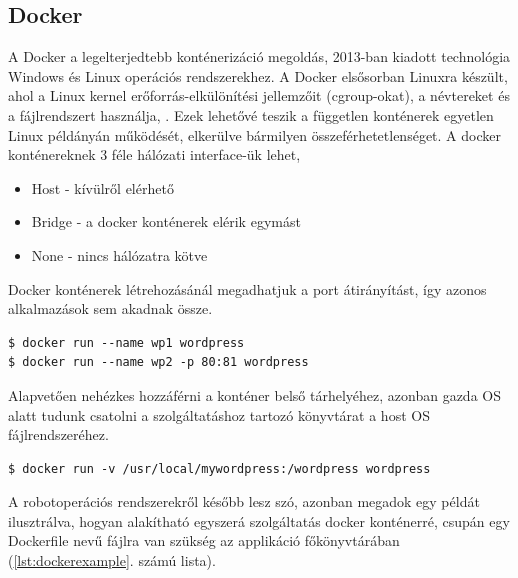 \subsection{Docker}
A Docker a legelterjedtebb konténerizáció megoldás, 2013-ban kiadott technológia Windows és Linux operációs rendszerekhez. A Docker elsősorban Linuxra készült, ahol a Linux kernel erőforrás-elkülönítési jellemzőit (cgroup-okat), a névtereket és a fájlrendszert használja, . Ezek lehetővé teszik a független konténerek egyetlen Linux példányán működését, elkerülve bármilyen összeférhetetlenséget.
A docker konténereknek 3 féle hálózati interface-ük lehet,
\begin{itemize}
	\item Host - kívülről elérhető
	\item Bridge - a docker konténerek elérik egymást
	\item None - nincs hálózatra kötve
\end{itemize}
Docker konténerek létrehozásánál megadhatjuk a port átirányítást, így azonos alkalmazások sem akadnak össze.
\begin{minipage}{\linewidth}
\begin{lstlisting}[caption={Példa két WordPress szolgáltatás párhuzamos indítására a 80 és 81-es portokon}]
$ docker run --name wp1 wordpress
$ docker run --name wp2 -p 80:81 wordpress
\end{lstlisting}
\end{minipage}
Alapvetően nehézkes hozzáférni a konténer belső tárhelyéhez, azonban gazda OS alatt tudunk csatolni a szolgáltatáshoz tartozó könyvtárat a host OS fájlrendszeréhez.
\begin{lstlisting}[caption={Példa volume csatolásához}]
$ docker run -v /usr/local/mywordpress:/wordpress wordpress
\end{lstlisting}
A robotoperációs rendszerekről később lesz szó, azonban megadok egy példát ilusztrálva, hogyan alakítható egyszerá szolgáltatás docker konténerré, csupán egy Dockerfile nevű fájlra van szükség az applikáció főkönyvtárában (\ref{lst:dockerexample}. számú lista).

